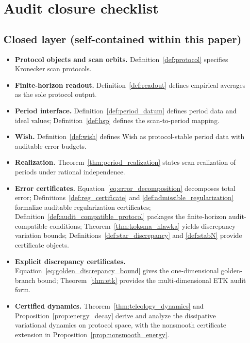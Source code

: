 
\section{Audit closure checklist}
\label{app:audit_checklist}

\subsection{Closed layer (self-contained within this paper)}
\label{app:closed_layer_list}

\begin{itemize}
\item \textbf{Protocol objects and scan orbits.} Definition~\ref{def:protocol} specifies Kronecker scan protocols.
\item \textbf{Finite-horizon readout.} Definition~\ref{def:readout} defines empirical averages as the sole protocol output.
\item \textbf{Period interface.} Definition~\ref{def:period_datum} defines period data and ideal values; Definition~\ref{def:hsp} defines the scan-to-period mapping.
\item \textbf{Wish.} Definition~\ref{def:wish} defines Wish as protocol-stable period data with auditable error budgets.
\item \textbf{Realization.} Theorem~\ref{thm:period_realization} states scan realization of periods under rational independence.
\item \textbf{Error certificates.} Equation~\ref{eq:error_decomposition} decomposes total error; Definitions~\ref{def:reg_certificate} and \ref{def:admissible_regularization} formalize auditable regularization certificates; Definition~\ref{def:audit_compatible_protocol} packages the finite-horizon audit-compatible conditions; Theorem~\ref{thm:koksma_hlawka} yields discrepancy--variation bounds; Definitions~\ref{def:star_discrepancy} and \ref{def:stabN} provide certificate objects.
\item \textbf{Explicit discrepancy certificates.} Equation~\ref{eq:golden_discrepancy_bound} gives the one-dimensional golden-branch bound; Theorem~\ref{thm:etk} provides the multi-dimensional ETK audit form.
\item \textbf{Certified dynamics.} Theorem~\ref{thm:teleology_dynamics} and Proposition~\ref{prop:energy_decay} derive and analyze the dissipative variational dynamics on protocol space, with the nonsmooth certificate extension in Proposition~\ref{prop:nonsmooth_energy}.
\end{itemize}

